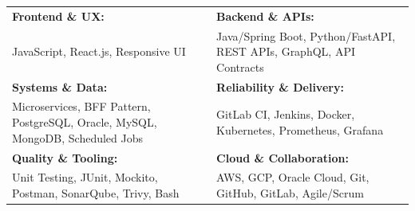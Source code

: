 \renewcommand{\arraystretch}{1.2}

\begin{tabular}{p{} p{}}
    \textbf{Frontend \& UX:} & \textbf{Backend \& APIs:} \\
    JavaScript, React.js, Responsive UI & Java/Spring Boot, Python/FastAPI, REST APIs, GraphQL, API Contracts \\

    \textbf{Systems \& Data:} & \textbf{Reliability \& Delivery:} \\
    Microservices, BFF Pattern, PostgreSQL, Oracle, MySQL, MongoDB, Scheduled Jobs & GitLab CI, Jenkins, Docker, Kubernetes, Prometheus, Grafana \\

    \textbf{Quality \& Tooling:} & \textbf{Cloud \& Collaboration:} \\
    Unit Testing, JUnit, Mockito, Postman, SonarQube, Trivy, Bash & AWS, GCP, Oracle Cloud, Git, GitHub, GitLab, Agile/Scrum \\
\end{tabular}
